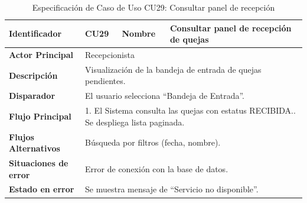 \begingroup
\setlength{\parskip}{0pt}
\begin{longtable}{|p{3.5cm}|p{2cm}|p{2.5cm}|p{7cm}|}
\caption{Especificación de Caso de Uso CU29: Consultar panel de recepción}
\label{tab:cu29_panel} \\
\hline
\textbf{Identificador} & CU29 & \textbf{Nombre} & Consultar panel de recepción de quejas \\ \hline
\textbf{Actor Principal} & \multicolumn{3}{p{11.5cm}|}{Recepcionista} \\ \hline
\textbf{Descripción} & \multicolumn{3}{p{11.5cm}|}{Visualización de la bandeja de entrada de quejas pendientes.} \\ \hline
\textbf{Disparador} & \multicolumn{3}{p{11.5cm}|}{El usuario selecciona ``Bandeja de Entrada''.} \\ \hline
\textbf{Flujo Principal} & \multicolumn{3}{p{11.5cm}|}{1. El Sistema consulta las quejas con estatus RECIBIDA.\newline 2. Se despliega lista paginada.} \\ \hline
\textbf{Flujos Alternativos} & \multicolumn{3}{p{11.5cm}|}{Búsqueda por filtros (fecha, nombre).} \\ \hline
\textbf{Situaciones de error} & \multicolumn{3}{p{11.5cm}|}{Error de conexión con la base de datos.} \\ \hline
\textbf{Estado en error} & \multicolumn{3}{p{11.5cm}|}{Se muestra mensaje de ``Servicio no disponible''.} \\ \hline
\end{longtable}
\endgroup

